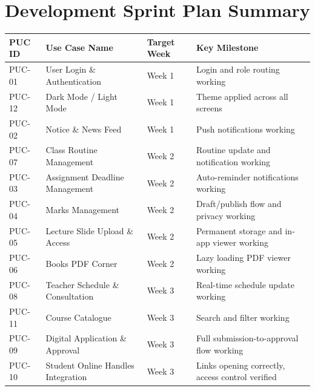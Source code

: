\documentclass[12pt,a4paper]{article}
\newcommand{\THH}[1]{\small\bfseries\color{white} #1}
\begin{document}
\section{Development Sprint Plan Summary}

\vspace{0.5em}
\begin{longtable}{|>{\centering\arraybackslash}p{1.5cm}|p{6cm}|>{\centering\arraybackslash}p{2.5cm}|p{4cm}|}
\hline
\rowcolor{navyblue}
\THH{PUC ID} & \THH{Use Case Name} & \THH{Target Week} & \THH{Key Milestone} \\
\hline
\endhead
PUC-01 & User Login \& Authentication & Week 1 & Login and role routing working \\
\hline
PUC-12 & Dark Mode / Light Mode & Week 1 & Theme applied across all screens \\
\hline
PUC-02 & Notice \& News Feed & Week 1 & Push notifications working \\
\hline
PUC-07 & Class Routine Management & Week 2 & Routine update and notification working \\
\hline
PUC-03 & Assignment Deadline Management & Week 2 & Auto-reminder notifications working \\
\hline
PUC-04 & Marks Management & Week 2 & Draft/publish flow and privacy working \\
\hline
PUC-05 & Lecture Slide Upload \& Access & Week 2 & Permanent storage and in-app viewer working \\
\hline
PUC-06 & Books PDF Corner & Week 2 & Lazy loading PDF viewer working \\
\hline
PUC-08 & Teacher Schedule \& Consultation & Week 3 & Real-time schedule update working \\
\hline
PUC-11 & Course Catalogue & Week 3 & Search and filter working \\
\hline
PUC-09 & Digital Application \& Approval & Week 3 & Full submission-to-approval flow working \\
\hline
PUC-10 & Student Online Handles Integration & Week 3 & Links opening correctly, access control verified \\
\hline
\end{longtable}
\end{document}
